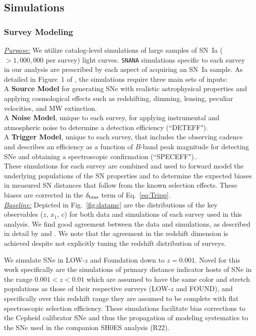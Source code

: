 \documentclass[twocolumn]{aastex63}
\begin{document}
\bigskip
\subsection{Simulations}
\label{sec:Sims}



\subsubsection{\textbf{Survey Modeling}}
\label{subsubsection:model}

\noindent\uline{\textit{Purpose:}} We utilize catalog-level simulations of large samples of SN~Ia ($>1,000,000$ per survey) light curves. \texttt{SNANA} simulations specific to each survey in our analysis are prescribed by each aspect of acquiring an SN~Ia sample. As detailed in Figure~1 of \cite{Kessler18}, the simulations require three main sets of inputs: \\
\noindent A \textbf{Source Model} for generating SNe with realistic astrophysical properties and applying cosmological effects such as redshifting, dimming, lensing, peculiar velocities, and MW extinction. \\
\noindent A \textbf{Noise Model}, unique to each survey, for applying instrumental and atmospheric noise to determine a detection efficiency (``DETEFF").\\
\noindent A \textbf{Trigger Model}, unique to each survey, {that includes the observing cadence and describes an efficiency as a function of $B$-band peak magnitude for detecting SNe and obtaining a spectroscopic confirmation (``SPECEFF").}. \\
\noindent These simulations for each survey are combined and used to forward model the underlying populations of the SN properties \citep{popovic21b,popovic21a} and to determine the expected biases in measured SN distances that follow from the known selection effects. These biases are corrected in the $\delta_{\rm bias}$ term of Eq.~\ref{eq:Tripp}. \\
\uline{\textit{Baseline:}}  
Depicted in Fig.~\ref{fig:datamc} are the distributions of the key observables ($z$, $x_1$, $c$) for both data and simulations of each survey used in this analysis. We find good agreement between the data and simulations, as described in detail by \cite{popovic21b} and \cite{popovic21a}. We note that the agreement in the redshift dimension is achieved despite not explicitly tuning the redshift distribution of surveys.

We simulate SNe in LOW-$z$ and Foundation down to $z = 0.001$. Novel for this work specifically are the simulations of primary distance indicator hosts of SNe in the range $0.001<z<0.01$ which are assumed to have the same color and stretch populations as those of their respective surveys (LOW-$z$ and FOUND), and specifically over this redshift range they are assumed to be complete with flat spectroscopic selection efficiency. These simulations facilitate bias corrections to the Cepheid calibrator SNe and thus the propagation of modeling systematics to the SNe used in the companion SH0ES analysis (R22). 
\end{document}
